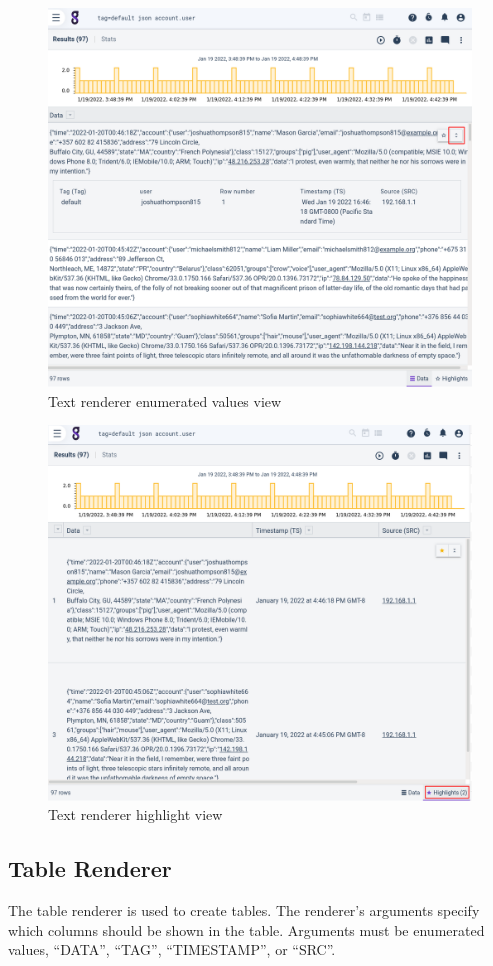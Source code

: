 \begin{figure}
	\includegraphics[width=0.7\linewidth]{images/text-ev.png}
	\caption{Text renderer enumerated values view}
	\label{fig:text-ev}
\end{figure}

\begin{figure}
	\includegraphics[width=0.7\linewidth]{images/text-highlights.png}
	\caption{Text renderer highlight view}
	\label{fig:text-highlights}
\end{figure}

\clearpage

\subsection{Table Renderer}
The table renderer is used to create tables. The renderer's arguments
specify which columns should be shown in the table. Arguments must be
enumerated values, ``DATA'', ``TAG'', ``TIMESTAMP'', or ``SRC''.

